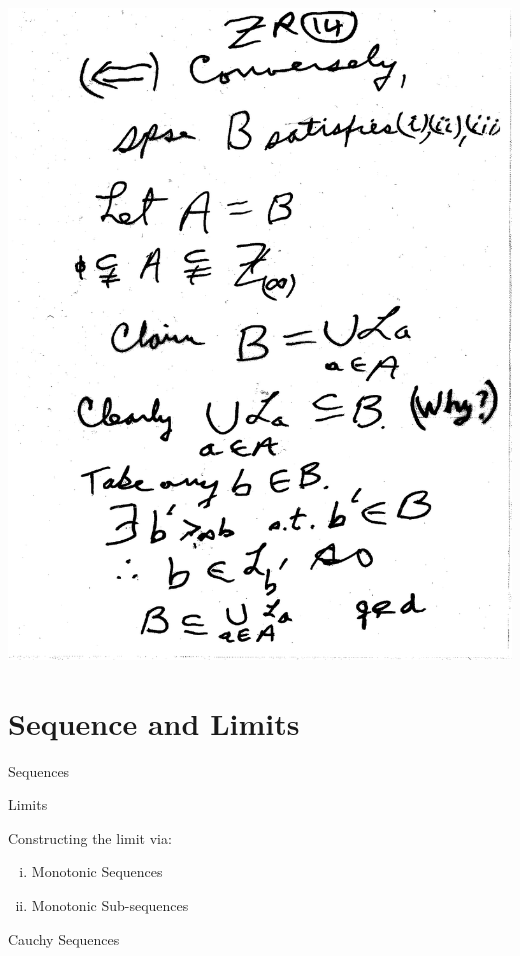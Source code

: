 \documentclass[10pt,a4paper]{article}
\begin{document}
{{\begin{enumerate}[(ii)]
\includegraphics[scale=.5]{Pages/ZR_14}

\end{enumerate}

\section{Sequence and Limits}


Sequences

Limits

Constructing the limit via:

\begin{enumerate} [(i)]

\item Monotonic Sequences
\item Monotonic Sub-sequences 

\end{enumerate}

Cauchy Sequences

}}
\end{document}

